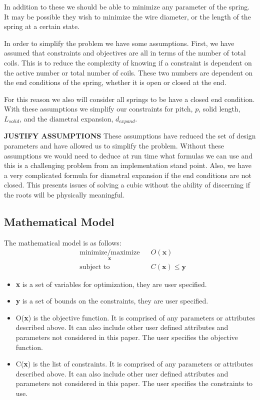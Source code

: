 \documentclass[10pt]{article}
\begin{document}
In addition to these we should be able to minimize any parameter of the spring. It may be possible they wish to minimize the wire diameter, or the length of the spring at a certain state.  

In order to simplify the problem we have some assumptions. First, we have assumed that constraints and objectives are all in terms of the number of total coils. This is to reduce the complexity of knowing if a constraint is dependent on the active number or total number of coils. These two numbers are dependent on the end conditions of the spring, whether it is open or closed at the end. 

For this reason we also will consider all springs to be have a closed end condition. With these assumptions we simplify our constraints for pitch, $p$, solid length, $L_{solid}$, and the diametral expansion, $d_{expand}$.

\textbf{JUSTIFY ASSUMPTIONS}
These assumptions have reduced the set of design parameters and have allowed us to simplify the problem. Without these assumptions we would need to deduce at run time what formulas we can use and this is a challenging problem from an implementation stand point. Also, we have a very complicated formula for diametral expansion if the end conditions are not closed. This presents issues of solving a cubic without the ability of discerning if the roots will be physically meaningful. 


\subsection{Mathematical Model}
			
			The mathematical model is as follows: 
				\begin{equation*}
 					\begin{aligned}
 						& \underset{\textbf{x}}{\text{minimize/maximize}}
 						& & O(\textbf{x}) \\
 						& \text{subject to}
 						& & C(\textbf{x}) \le \textbf{y}
 					\end{aligned}
				\end{equation*}

\begin{itemize}
	\item \textbf{x} is a set of variables for optimization, they are user specified.
	
	\item \textbf{y} is a set of bounds on the constraints, they are user specified.
	
	\item O(\textbf{x}) is the objective function. It is comprised of any parameters or attributes described above. It can also include other user defined attributes and parameters not considered in this paper. The user specifies the objective function.  
	
	\item C(\textbf{x}) is the list of constraints. It is comprised of any parameters or attributes described above. It can also include other user defined attributes and parameters not considered in this paper. The user specifies the constraints to use.
\end{itemize}
\end{document}
